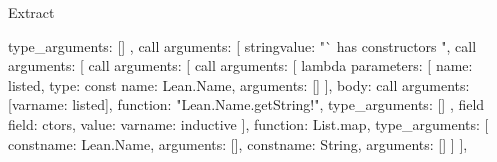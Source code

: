 \begin{lexlean}{Extract}
\begin{toolingmodule}
{{{{{{{{{{{{{{                                          type_arguments: []
                                        },
                                        call{
                                          arguments: [
                                            string{value: "` has constructors "},
                                            call{
                                              arguments: [
                                                call{
                                                  arguments: [
                                                    call{
                                                      arguments: [
                                                        lambda{
                                                          parameters: [
                                                            {
                                                              name: listed,
                                                              type: const{
                                                                name: Lean.Name,
                                                                arguments: []
                                                              }
                                                            }
                                                          ],
                                                          body: call{
                                                            arguments: [var{name: listed}],
                                                            function: "Lean.Name.getString!",
                                                            type_arguments: []
                                                          }
                                                        },
                                                        field{
                                                          field: ctors,
                                                          value: var{name: inductive}
                                                        }
                                                      ],
                                                      function: List.map,
                                                      type_arguments: [
                                                        const{name: Lean.Name, arguments: []},
                                                        const{name: String, arguments: []}
                                                      ]
                                                    }
                                                  ],
}}}}}}}}}}}}}}}}
\end{toolingmodule}
\end{lexlean}
